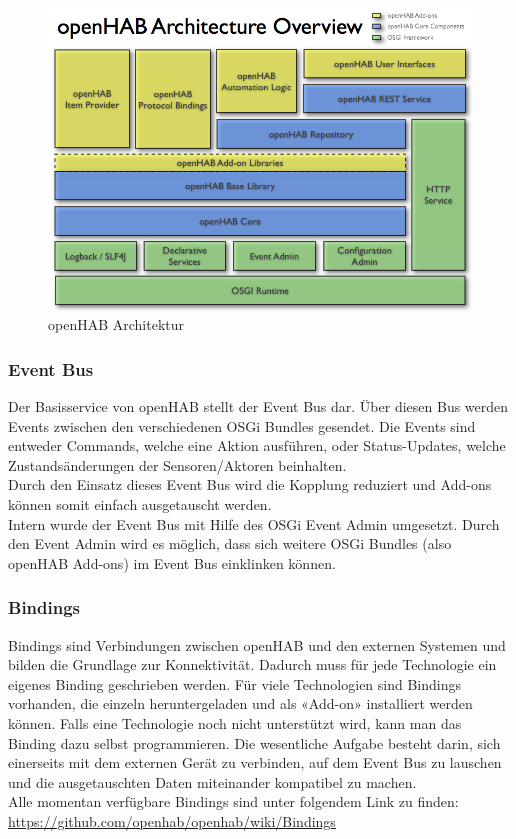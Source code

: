 \begin{figure}[H]
	\centering
		\includegraphics[scale=0.45]{report/img/openHAB_architecture}
	\caption{openHAB Architektur}
	\label{fig:ohArch}
\end{figure}

\subsubsection{Event Bus}
Der Basisservice von openHAB stellt der Event Bus dar. Über diesen Bus werden Events zwischen den verschiedenen OSGi Bundles gesendet. Die Events sind entweder Commands, welche eine Aktion ausführen, oder Status-Updates, welche Zustandsänderungen der Sensoren/Aktoren beinhalten. \\
Durch den Einsatz dieses Event Bus wird die Kopplung reduziert und Add-ons können somit einfach ausgetauscht werden. \\
Intern wurde der Event Bus mit Hilfe des OSGi Event Admin umgesetzt. Durch den Event Admin wird es möglich, dass sich weitere OSGi Bundles (also openHAB Add-ons) im Event Bus einklinken können.

\subsubsection{Bindings}
Bindings sind Verbindungen zwischen openHAB und den externen Systemen und bilden die Grundlage zur Konnektivität. Dadurch muss für jede Technologie ein eigenes Binding geschrieben werden. Für viele Technologien sind Bindings vorhanden, die einzeln heruntergeladen und als «Add-on» installiert werden können. Falls eine Technologie noch nicht unterstützt wird, kann man das Binding dazu selbst programmieren. Die wesentliche Aufgabe besteht darin, sich einerseits mit dem externen Gerät zu verbinden, auf dem Event Bus zu lauschen und die ausgetauschten Daten miteinander kompatibel zu machen. \\
Alle momentan verfügbare Bindings sind unter folgendem Link zu finden: \url{https://github.com/openhab/openhab/wiki/Bindings}

